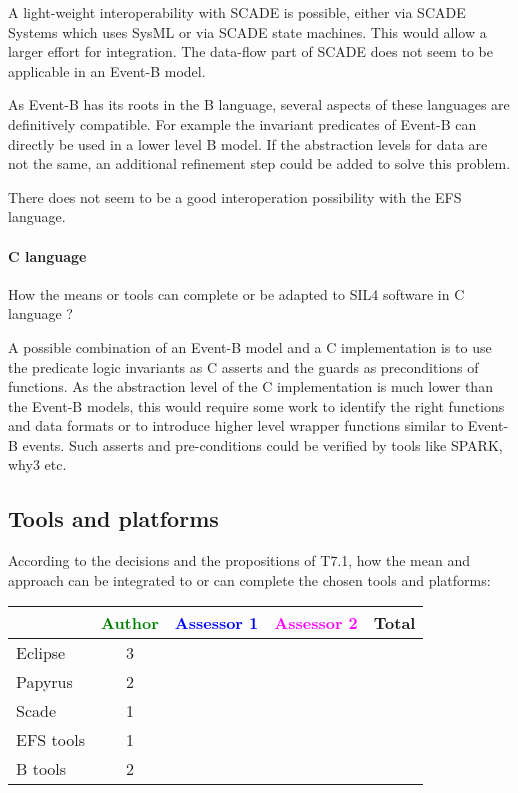 \begin{author_comment}
  A light-weight interoperability with SCADE is possible, either via SCADE
  Systems which uses SysML or via SCADE state machines. This would allow a
  larger effort for integration. The data-flow part of SCADE does not seem to be
  applicable in an Event-B model.

  As Event-B has its roots in the B language, several aspects of these languages
  are definitively compatible. For example the invariant predicates of Event-B
  can directly be used in a lower level B model. If the abstraction levels for
  data are not the same, an additional refinement step could be added to solve
  this problem.

  There does not seem to be a good interoperation possibility with the EFS
  language.
\end{author_comment}


\paragraph{C language}
How the means or tools can complete or be adapted to SIL4 software in C language ?

\begin{author_comment}
  A possible combination of an Event-B model and a C implementation is to use
  the predicate logic invariants as C asserts and the guards as preconditions of
  functions. As the abstraction level of the C implementation is much lower than
  the Event-B models, this would require some work to identify the right
  functions and data formats or to introduce higher level wrapper functions
  similar to Event-B events. Such asserts and pre-conditions could be verified
  by tools like SPARK, why3 etc.
\end{author_comment}

\subsection{Tools and platforms}

According to the decisions and the propositions of T7.1, how the mean and approach can be integrated to or can complete the chosen tools and platforms:

\begin{tabular}{|l | c | c | c | c|}
\hline
& \textcolor{green}{Author} & \textcolor{blue}{Assessor 1} & \textcolor{magenta}{Assessor 2} & Total \\
\hline 
Eclipse & 3 & & &  \\
\hline
Papyrus  & 2 & & & \\
\hline
Scade & 1 & & & \\
\hline
EFS tools & 1 & & & \\
\hline
B tools & 2 & & & \\
\hline
\end{tabular}


